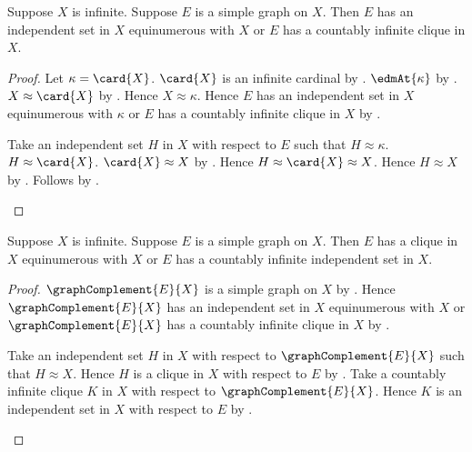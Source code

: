 \begin{theorem}\label{erdos_dushnik_miller_graph}
    Suppose $X$ is infinite.
    Suppose $E$ is a simple graph on $X$.
    Then $E$ has an independent set in $X$ equinumerous with $X$
        or $E$ has a countably infinite clique in $X$.
\end{theorem}
\begin{proof}
    Let $\kappa=\card{X}$.
    $\card{X}$ is an infinite cardinal by
        .
    $\edmAt{\kappa}$ by .
    $X\approx\card{X}$ by .
    Hence $X\approx\kappa$.
    Hence $E$ has an independent set in $X$ equinumerous with $\kappa$ or
        $E$ has a countably infinite clique in $X$ by
        .
    \begin{byCase}
            Take an independent set $H$ in $X$ with respect to $E$
                such that $H\approx\kappa$.
            $H\approx\card{X}$.
            $\card{X}\approx X$ by .
            Hence $H\approx\card{X}\approx X$.
            Hence $H\approx X$ by .
            Follows by \auto.
    \end{byCase}
\end{proof}

\begin{theorem}\label{erdos_dushnik_miller_complementary_graph}
    Suppose $X$ is infinite.
    Suppose $E$ is a simple graph on $X$.
    Then $E$ has a clique in $X$ equinumerous with $X$ or
        $E$ has a countably infinite independent set in $X$.
\end{theorem}
\begin{proof}
    $\graphComplement{E}{X}$ is a simple graph on $X$ by
        .
    Hence $\graphComplement{E}{X}$ has an independent set in $X$
            equinumerous with $X$ or
        $\graphComplement{E}{X}$ has a countably infinite clique in $X$ by
        .
    \begin{byCase}
            Take an independent set $H$ in $X$ with respect to
                $\graphComplement{E}{X}$ such that $H\approx X$.
            Hence $H$ is a clique in $X$ with respect to $E$ by
                .
            Take a countably infinite clique $K$ in $X$ with respect to
                $\graphComplement{E}{X}$.
            Hence $K$ is an independent set in $X$ with respect to $E$ by
                .
    \end{byCase}
\end{proof}
